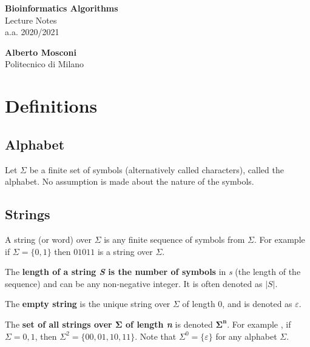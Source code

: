 \documentclass[12pt, letterpaper]{article}
\begin{document}
\begin{titlepage}
    
    \vspace*{2cm}
    
    \begin{center}
        \huge{\bfseries Bioinformatics Algorithms} \\[10pt]
        \Large{Lecture Notes} \\[10pt]
        \large{a.a. 2020/2021} \\
    \end{center}
    
    \vfill
    
    \begin{flushleft}        
        \large
        \textbf{Alberto Mosconi} \\
        \normalsize
        Politecnico di Milano
    \end{flushleft}
    
\end{titlepage}

\thispagestyle{empty}
\tableofcontents
\newpage

\setcounter{page}{1}

\section{Definitions}

\subsection{Alphabet}
Let $\Sigma$ be a finite set of symbols (alternatively called characters), called the alphabet. No assumption is made about the nature of the symbols.

\subsection{Strings}
A string (or word) over $\Sigma$ is any finite sequence of symbols from $\Sigma$. For example if $\Sigma = \{0,1\}$ then $01011$ is a string over $\Sigma$.

The \textbf{length of a string \emph{S} is the number of symbols} in \emph{s} (the length of the sequence) and can be any non-negative integer. It is often denoted as $|S|$.

The \textbf{empty string} is the unique string over $\Sigma$ of length 0, and is denoted as $\varepsilon$.

The \textbf{set of all strings over $\mathbf{\Sigma}$ of length \emph{n}} is denoted $\mathbf{\Sigma^n}$. For example , if $\Sigma = {0, 1}$, then $\Sigma^2 = \{00, 01, 10, 11\}$. Note that $\Sigma^0 = \{\varepsilon\}$ for any alphabet $\Sigma$.
\end{document}
